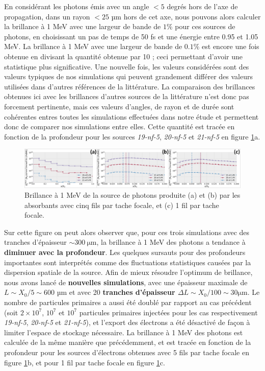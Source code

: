 \begin{refsection}
En considérant les photons émis avec un angle $<5$ degrés hors de l'axe de propagation, dans un rayon $<25$ µm hors de cet axe, nous pouvons alors calculer la brillance à 1 MeV avec une largeur de bande de $1\%$ pour ces sources de photons, en choisissant un pas de temps de 50 fs et une énergie entre 0.95 et 1.05 MeV. La brillance à 1 MeV avec une largeur de bande de $0.1\%$ est encore une fois obtenue en divisant la quantité obtenue par 10 ; ceci permettant d'avoir une statistique plus significative. Une nouvelle fois, les valeurs considérées sont des valeurs typiques de nos simulations qui peuvent grandement différer des valeurs utilisées dans d'autres références de la littérature. La comparaison des brillances obtenues ici avec les brillances d'autres sources de la littérature n'est donc pas forcement pertinente, mais ces valeurs d'angles, de rayon et de durée sont cohérentes entres toutes les simulations effectuées dans notre étude et permettent donc de comparer nos simulations entre elles. Cette quantité est tracée en fonction de la profondeur pour les sources \textit{19-nf-5}, \textit{20-nf-5} et \textit{21-nf-5} en figure \ref{fig:63-brillance_epaisseur}a.

\begin{figure}[hbtp]
	\centering
	\includegraphics[width=\linewidth]{6-opti_numerique/brillance_epaisseur.png}
    \caption{Brillance à 1 MeV de la source de photons produite (a) et (b) par les absorbants avec cinq fils par tache focale, et (c) 1 fil par tache focale.}
    \label{fig:63-brillance_epaisseur}
\end{figure}

Sur cette figure on peut alors observer que, pour ces trois simulations avec des tranches d'épaisseur $\sim 300 ~ \si{\um}$, la brillance à 1 MeV des photons a tendance à \textbf{diminuer avec la profondeur}. Les quelques sursauts pour des profondeurs importantes sont interprétés comme des fluctuations statistiques causées par la dispersion spatiale de la source. Afin de mieux résoudre l'optimum de brillance, nous avons lancé de \textbf{nouvelles simulations}, avec une épaisseur maximale de $L \sim X_0/5 \sim 600$ µm et avec 20 \textbf{tranches d'épaisseur $\Delta L \sim X_0/100 \sim 30 \si{\um}$}. Le nombre de particules primaires a aussi été doublé par rapport au cas précédent (soit $2 \times 10^7$, $10^7$ et $10^7$ particules primaires injectées pour les cas respectivement \textit{19-nf-5}, \textit{20-nf-5} et \textit{21-nf-5}), et l'export des électrons a été désactivé de façon à limiter l'espace de stockage nécessaire. La brillance à 1 MeV des photons est calculée de la même manière que précédemment, et est tracée en fonction de la profondeur pour les sources d'électrons obtenues avec 5 fils par tache focale en figure \ref{fig:63-brillance_epaisseur}b, et pour 1 fil par tache focale en figure \ref{fig:63-brillance_epaisseur}c.


\end{refsection}
